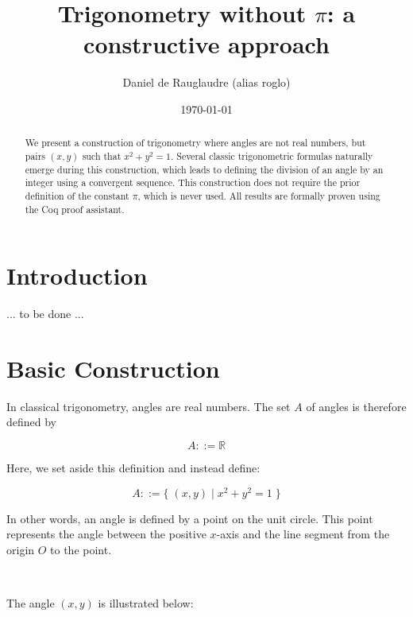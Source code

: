 \documentclass[11pt]{article}
\title{Trigonometry without $\pi$: a constructive approach}
\author{Daniel de Rauglaudre (alias roglo)}
\date{\today}
\theoremstyle{definition}
\begin{document}
\maketitle

\begin{abstract}
We present a construction of trigonometry where angles are not real
numbers, but pairs $(x,y)$ such that $x^2 + y^2 = 1$. Several classic
trigonometric formulas naturally emerge during this construction,
which leads to defining the division of an angle by an integer using a
convergent sequence. This construction does not require the prior
definition of the constant $\pi$, which is never used. All results are
formally proven using the Coq proof assistant.
\end{abstract}

\section{Introduction}

... to be done ...

\section{Basic Construction}

In classical trigonometry, angles are real numbers. The set \( A \) of
angles is therefore defined by

\[
A ::= \mathbb{R}
\]

\noindent Here, we set aside this definition and instead define:

\[
A ::= \{ \; (x, y) \; | \; x^2 + y^2 = 1 \; \}
\]

\noindent In other words, an angle is defined by a point on the unit
circle. This point represents the angle between the positive \( x
\)-axis and the line segment from the origin \( O \) to the point.

\

\noindent The angle \( (x, y) \) is illustrated below:

\

\end{document}
